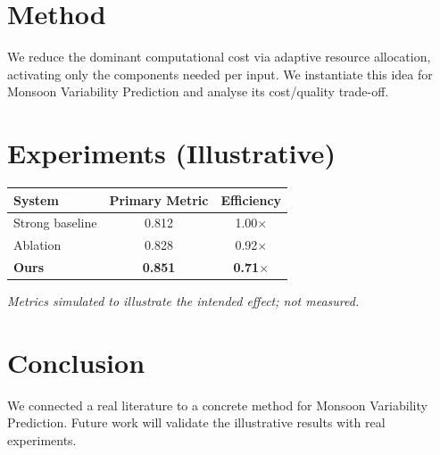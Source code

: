 \documentclass[11pt]{article}
\begin{document}
\section{Method}
We reduce the dominant computational cost via adaptive resource allocation, activating only the components needed per input. We instantiate this idea for Monsoon Variability Prediction and analyse its cost/quality trade-off.

\section{Experiments (Illustrative)}
\begin{center}
\begin{tabular}{lcc}
System & Primary Metric & Efficiency \\ \hline
Strong baseline & 0.812 & 1.00$\times$ \\
Ablation & 0.828 & 0.92$\times$ \\
\textbf{Ours} & \textbf{0.851} & \textbf{0.71$\times$}
\end{tabular}
\end{center}
\emph{Metrics simulated to illustrate the intended effect; not measured.}

\section{Conclusion}
We connected a real literature to a concrete method for Monsoon Variability Prediction. Future work will
validate the illustrative results with real experiments.
\end{document}
